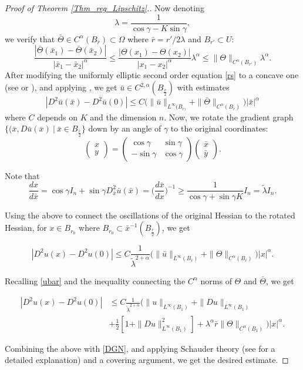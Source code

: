 \documentclass[12pt,reqno]{amsart}%
\theoremstyle{plain}
\numberwithin{equation}{section}
\theoremstyle{definition}
\theoremstyle{remark}
\begin{document}
\begin{proof}[Proof of Theorem \ref{Thm_reg_Lipschitz}.]
    
   Now denoting \[
    \lambda=\frac{1}{\cos\gamma-K\sin\gamma},
    \]
    we verify that $\bar \Theta \in C^{\alpha}(B_{\bar r}) \subset \Omega$ where $\bar r= r'/2\lambda$ and $B_{r'}\subset U$:
    \[
    \frac{|\bar\Theta(\bar x_1)-\bar\Theta(\bar x_2)|}{|\bar x_1-\bar x_2|^\alpha}\leq  \frac{|\Theta( x_1)-\Theta( x_2)|}{| x_1- x_2|^{\alpha}}\lambda^{\alpha}\leq \|\Theta\|_{C^{\alpha}(B_{r'})}\lambda^{\alpha}.
    \]
    After modifying the uniformly elliptic second order equation \eqref{rs} to a concave one (see \cite[pg 347]{ChenWarren} or \cite[Lemma 2.2]{CPW}), and applying \cite[Corollary 1.3]{CC01}, we get $\bar u\in C^{2,\alpha}(B_{\frac{\bar r}{2}})$ with estimates
    \[
    |D^2\bar u(\bar x)-D^2\bar u(0)|\leq C\bigg( \|\bar u\|_{L^{\infty}(B_{\bar{r})}}+\|\bar \Theta\|_{C^{\alpha}(B_{\bar{r}})}\bigg) |\bar x |^\alpha 
    \] where $C$ depends on $K$ and the dimension $n$.
    Now, we rotate the gradient graph $\{ (\bar x, D\bar u(\bar x)\:|\: \bar x \in B_{\frac{\bar r}{2}}\}$ down by an angle of $\gamma$ to the original coordinates: 
    $$ \begin{pmatrix} 
x \\  y 
\end{pmatrix} 
= 
\begin{pmatrix} 
\cos \gamma &  \sin \gamma 
\\ -\sin \gamma &\cos \gamma  
\end{pmatrix} 
\begin{pmatrix} 
\bar x \\ \bar y
\end{pmatrix}. $$

Note that 
\[
\frac{dx}{d\bar x}=\cos\gamma I_n+\sin\gamma D^2_{\bar x}\bar u(\bar x)=\bigg(\frac{d\bar x}{d x}\bigg)^{-1}\geq \frac{1}{\cos\gamma+\sin\gamma K}I_n=\tilde\lambda I_n.
\]

Using the above to connect the oscillations of the original Hessian to the rotated Hessian, for $x\in B_{r_0}$ where $B_{r_0}\subset \bar x^{-1}(B_{\frac{\bar r}{2}})$, we get

\[
|D^2u(x)-D^2u(0)|\leq C \frac{1}{\tilde \lambda^{2+\alpha}}\bigg(\|\bar u\|_{L^{\infty}(B_{\bar r})}+\|\Theta\|_{C^{\alpha}(B_{\bar r})}\bigg)|x|^{\alpha}.
\]

Recalling \eqref{ubar} and the inequality connecting the $C^{\alpha}$ norms of $\Theta$ and $\bar \Theta$, we get 



\begin{align*}
    |D^2u(x)-D^2u(0)| &\leq C\frac{1}{\tilde \lambda^{2+\alpha}}\bigg(\| u\|_{L^{\infty}(B_1)}+\| Du\|_{L^{\infty}(B_1)}\\
    &+ \frac{1}{2}[1+\| Du\|^2_{L^{\infty}(B_1)}]+ \lambda^{\alpha}\bar r\|\Theta\|_{C^{\alpha}(B_1)}\bigg)|x|^{\alpha}.
\end{align*}

Combining the above with \eqref{DGN}, and applying Schauder theory (see \cite[pg 347-349]{ChenWarren} for a detailed explanation) and a covering argument, we get the desired estimate. 
\end{proof}













\end{document}
